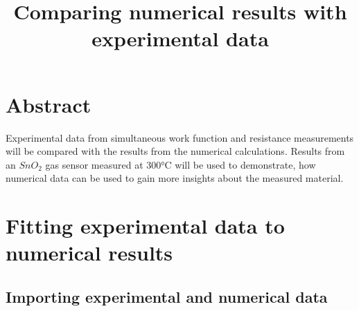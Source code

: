 \documentclass[11pt]{article}
\title{Comparing numerical results with experimental data}
\begin{document}
    
    \maketitle
    
    

    
    \tableofcontents 
\setcounter{section}{0}

    \hypertarget{abstract}{%
\section{Abstract}\label{abstract}}

Experimental data from simultaneous work function and resistance
measurements will be compared with the results from the numerical
calculations. Results from an \(SnO_2\) gas sensor measured at 300°C
will be used to demonstrate, how numerical data can be used to gain more
insights about the measured material.

    \hypertarget{fitting-experimental-data-to-numerical-results}{%
\section{Fitting experimental data to numerical
results}\label{fitting-experimental-data-to-numerical-results}}

\hypertarget{importing-experimental-and-numerical-data}{%
\subsection{Importing experimental and numerical
data}\label{importing-experimental-and-numerical-data}}
\end{document}
